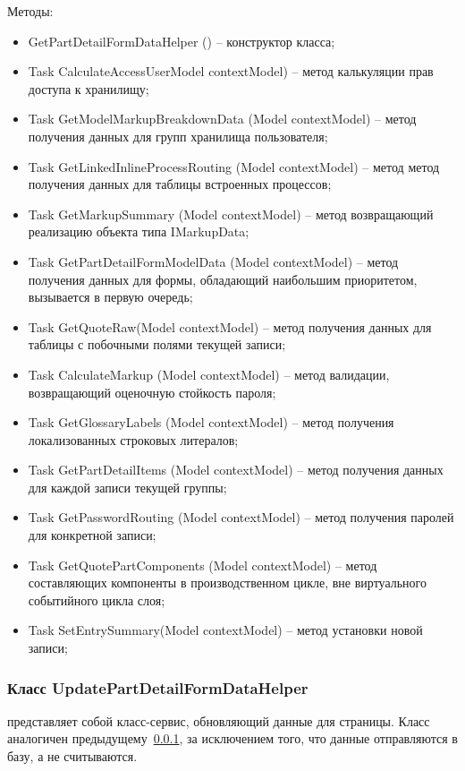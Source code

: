 Методы:
\begin{itemize}
  \item GetPartDetailFormDataHelper () – конструктор класса;
  \item Task CalculateAccessUserModel contextModel) – метод калькуляции прав доступа к хранилищу;
  \item Task GetModelMarkupBreakdownData (Model contextModel) – метод получения данных для групп хранилища пользователя;
  \item Task GetLinkedInlineProcessRouting (Model contextModel) – метод метод получения данных для таблицы встроенных процессов;
  \item Task GetMarkupSummary (Model contextModel) – метод возвращающий реализацию объекта типа IMarkupData;
  \item Task GetPartDetailFormModelData (Model contextModel) – метод получения данных для формы, обладающий наибольшим приоритетом, вызывается в первую очередь;
  \item Task GetQuoteRaw(Model contextModel) – метод получения данных для таблицы с побочными полями текущей записи;
  \item Task CalculateMarkup (Model contextModel) – метод валидации, возвращающий оценочную стойкость пароля;
  \item Task GetGlossaryLabels (Model contextModel) – метод получения локализованных строковых литералов;
  \item Task GetPartDetailItems (Model contextModel) – метод получения данных для каждой записи текущей группы;
  \item Task GetPasswordRouting (Model contextModel) – метод получения паролей для конкретной записи;
  \item Task GetQuotePartComponents (Model contextModel) – метод составляющих компоненты в производственном цикле, вне виртуального событийного цикла слоя;
  \item Task SetEntrySummary(Model contextModel) – метод установки новой записи;
\end{itemize}

\subsubsection{Класс UpdatePartDetailFormDataHelper }
\label{sub:arch_and_mod:data_layer:view_part_detail}

представляет собой класс-сервис, обновляющий данные для страницы. Класс аналогичен предыдущему~\ref{sub:arch_and_mod:data_layer:view_part_detail}, за исключением того, что данные отправляются в базу, а не считываются.


